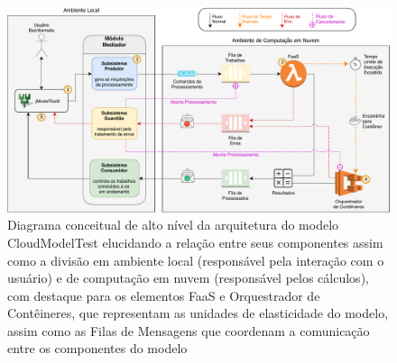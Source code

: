 \documentclass[english,brazilian]{UNISINOSmonografia} %
\begin{document}
\begin{figure}[tb]
\centering%
\begin{minipage}{\textwidth}
	\caption[Diagrama conceitual de alto nível da arquitetura do modelo CloudModelTest elucidando a relação entre seus componentes assim como a divisão em ambiente local e de computação em nuvem, com destaque para os elementos FaaS e Orquestrador de Contêineres, que representam as unidades de elasticidade do modelo, assim como as Filas de Mensagens que coordenam a comunicação entre os componentes do modelo]{Diagrama conceitual de alto nível da arquitetura do modelo CloudModelTest elucidando a relação entre seus componentes assim como a divisão em ambiente local (responsável pela interação com o usuário) e de computação em nuvem (responsável pelos cálculos), com destaque para os elementos FaaS e Orquestrador de Contêineres, que representam as unidades de elasticidade do modelo, assim como as Filas de Mensagens que coordenam a comunicação entre os componentes do modelo}
	\label{fig:modelo-arq-full}
	\vspace{1ex}
	\includegraphics[width=\textwidth]{modelo-full}

\end{minipage}
\end{figure}
\end{document}
